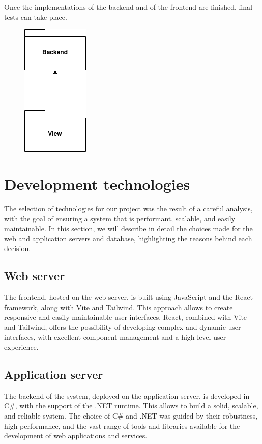 Once the implementations of the backend and of the frontend are finished, final tests can take place.

\begin{figure}[H]
    \centering
    \includegraphics[width=0.1\linewidth]{../assets/implementation-plan-diagrams/implementation-plan-6.png}
\end{figure}

\section{Development technologies}

The selection of technologies for our project was the result of a careful analysis, with the goal of ensuring a system that is performant, scalable, and easily maintainable.
In this section, we will describe in detail the choices made for the web and application servers and database, highlighting the reasons behind each decision.

\subsection{Web server}

The frontend, hosted on the web server, is built using JavaScript and the React framework, along with Vite and Tailwind.
This approach allows to create responsive and easily maintainable user interfaces.
React, combined with Vite and Tailwind, offers the possibility of developing complex and dynamic
user interfaces, with excellent component management and a high-level user experience.

\subsection{Application server}

The backend of the system, deployed on the application server, is developed in C\#, with the support of the .NET runtime.
This allows to build a solid, scalable, and reliable system.
The choice of C\# and .NET was guided by their robustness, high performance, and the vast range of tools and libraries available for the development of web applications and services.

